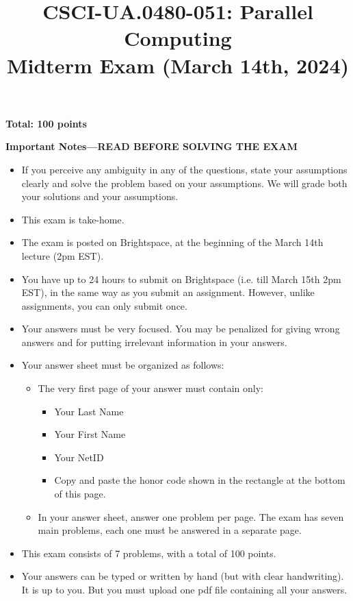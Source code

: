 \documentclass{article}
\begin{document}
\title{CSCI-UA.0480-051: Parallel Computing \\ Midterm Exam (March 14th, 2024)}
\author{}
\date{}
\maketitle

\textbf{Total: 100 points}

\textbf{Important Notes---READ BEFORE SOLVING THE EXAM}
\begin{itemize}
    \item If you perceive any ambiguity in any of the questions, state your assumptions clearly and solve the problem based on your assumptions. We will grade both your solutions and your assumptions.
    \item This exam is take-home.
    \item The exam is posted on Brightspace, at the beginning of the March 14th lecture (2pm EST).
    \item You have up to 24 hours to submit on Brightspace (i.e. till March 15th 2pm EST), in the same way as you submit an assignment. However, unlike assignments, you can only submit once.
    \item Your answers must be very focused. You may be penalized for giving wrong answers and for putting irrelevant information in your answers.
    \item Your answer sheet must be organized as follows:
    \begin{itemize}
        \item The very first page of your answer must contain only:
        \begin{itemize}
            \item Your Last Name
            \item Your First Name
            \item Your NetID
            \item Copy and paste the honor code shown in the rectangle at the bottom of this page.
        \end{itemize}
        \item In your answer sheet, answer one problem per page. The exam has seven main problems, each one must be answered in a separate page.
    \end{itemize}
    \item This exam consists of 7 problems, with a total of 100 points.
    \item Your answers can be typed or written by hand (but with clear handwriting). It is up to you. But you must upload one pdf file containing all your answers.
\end{itemize}
\end{document}
